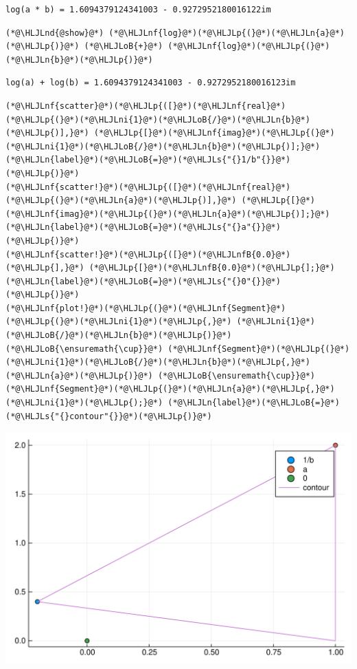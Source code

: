 \documentclass[12pt,a4paper]{article}
\newcommand{\HLJLn}[1]{#1}
\newcommand{\HLJLnd}[1]{\textcolor[RGB]{214,102,97}{#1}}
\newcommand{\HLJLnf}[1]{\textcolor[RGB]{66,102,213}{#1}}
\newcommand{\HLJLs}[1]{\textcolor[RGB]{201,61,57}{#1}}
\newcommand{\HLJLnfB}[1]{\textcolor[RGB]{59,151,46}{#1}}
\newcommand{\HLJLni}[1]{\textcolor[RGB]{59,151,46}{#1}}
\newcommand{\HLJLoB}[1]{\textcolor[RGB]{102,102,102}{\textbf{#1}}}
\newcommand{\HLJLp}[1]{#1}
\begin{document}
\begin{lstlisting}
log(a * b) = 1.6094379124341003 - 0.9272952180016122im
\end{lstlisting}


\begin{lstlisting}
(*@\HLJLnd{@show}@*) (*@\HLJLnf{log}@*)(*@\HLJLp{(}@*)(*@\HLJLn{a}@*)(*@\HLJLp{)}@*) (*@\HLJLoB{+}@*) (*@\HLJLnf{log}@*)(*@\HLJLp{(}@*)(*@\HLJLn{b}@*)(*@\HLJLp{)}@*)
\end{lstlisting}

\begin{lstlisting}
log(a) + log(b) = 1.6094379124341003 - 0.9272952180016123im
\end{lstlisting}


\begin{lstlisting}
(*@\HLJLnf{scatter}@*)(*@\HLJLp{([}@*)(*@\HLJLnf{real}@*)(*@\HLJLp{(}@*)(*@\HLJLni{1}@*)(*@\HLJLoB{/}@*)(*@\HLJLn{b}@*)(*@\HLJLp{)],}@*) (*@\HLJLp{[}@*)(*@\HLJLnf{imag}@*)(*@\HLJLp{(}@*)(*@\HLJLni{1}@*)(*@\HLJLoB{/}@*)(*@\HLJLn{b}@*)(*@\HLJLp{)];}@*) (*@\HLJLn{label}@*)(*@\HLJLoB{=}@*)(*@\HLJLs{"{}1/b"{}}@*)(*@\HLJLp{)}@*)
(*@\HLJLnf{scatter!}@*)(*@\HLJLp{([}@*)(*@\HLJLnf{real}@*)(*@\HLJLp{(}@*)(*@\HLJLn{a}@*)(*@\HLJLp{)],}@*) (*@\HLJLp{[}@*)(*@\HLJLnf{imag}@*)(*@\HLJLp{(}@*)(*@\HLJLn{a}@*)(*@\HLJLp{)];}@*) (*@\HLJLn{label}@*)(*@\HLJLoB{=}@*)(*@\HLJLs{"{}a"{}}@*)(*@\HLJLp{)}@*)
(*@\HLJLnf{scatter!}@*)(*@\HLJLp{([}@*)(*@\HLJLnfB{0.0}@*)(*@\HLJLp{],}@*) (*@\HLJLp{[}@*)(*@\HLJLnfB{0.0}@*)(*@\HLJLp{];}@*) (*@\HLJLn{label}@*)(*@\HLJLoB{=}@*)(*@\HLJLs{"{}0"{}}@*)(*@\HLJLp{)}@*)
(*@\HLJLnf{plot!}@*)(*@\HLJLp{(}@*)(*@\HLJLnf{Segment}@*)(*@\HLJLp{(}@*)(*@\HLJLni{1}@*)(*@\HLJLp{,}@*) (*@\HLJLni{1}@*)(*@\HLJLoB{/}@*)(*@\HLJLn{b}@*)(*@\HLJLp{)}@*) (*@\HLJLoB{\ensuremath{\cup}}@*) (*@\HLJLnf{Segment}@*)(*@\HLJLp{(}@*)(*@\HLJLni{1}@*)(*@\HLJLoB{/}@*)(*@\HLJLn{b}@*)(*@\HLJLp{,}@*) (*@\HLJLn{a}@*)(*@\HLJLp{)}@*) (*@\HLJLoB{\ensuremath{\cup}}@*) (*@\HLJLnf{Segment}@*)(*@\HLJLp{(}@*)(*@\HLJLn{a}@*)(*@\HLJLp{,}@*) (*@\HLJLni{1}@*)(*@\HLJLp{);}@*) (*@\HLJLn{label}@*)(*@\HLJLoB{=}@*)(*@\HLJLs{"{}contour"{}}@*)(*@\HLJLp{)}@*)
\end{lstlisting}

\includegraphics[width=\linewidth]{figures/Solutions2_19_1.pdf}
\end{document}
